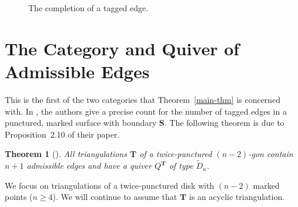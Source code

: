 \documentclass[11pt]{amsart}
\theoremstyle{plain}
\newtheorem{theorem}{Theorem}[section]
\theoremstyle{definition}
\numberwithin{equation}{section}
\def\surf{\mathbf{S}}                       %
\def\TT{\mathbf{T}}
\begin{document}
\begin{figure}[h]
    \caption{The completion of a tagged edge.}
    \label{fig:completion}
\end{figure}



\section{The Category and Quiver of Admissible Edges}

This is the first of the two categories that Theorem~\ref{main-thm} is concerned with.
In \cite{fomin_cluster_2008}, the authors give a precise count for the number of tagged edges in a punctured, marked surface with boundary $\surf$.
The following theorem is due to Proposition~2.10 of their paper.

\begin{theorem}[\cite{fomin_cluster_2008}] \label{thm-nplus3}
    All triangulations $\TT$ of a twice-punctured $(n-2)$-gon contain $n+1$ admissible edges and have a quiver $Q^\TT$ of type $\widetilde{D}_{n}$.
\end{theorem}

We focus on triangulations of a twice-punctured disk with $(n-2)$ marked points ($n \geq 4$).
We will continue to assume that $\TT$ is an acyclic triangulation.
\end{document}
